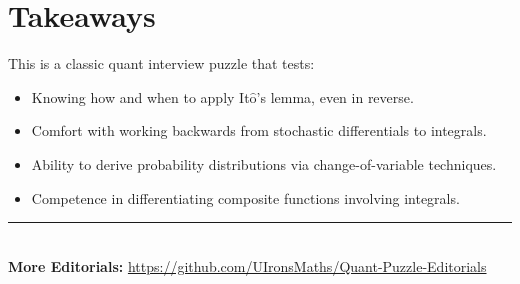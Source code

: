 \documentclass[12pt]{article}
\newcommand{\Itos}{It$\hat{\text{o}}$'s }
\begin{document}
\bigskip

\section*{Takeaways}
This is a classic quant interview puzzle that tests:

\begin{itemize}
    \item Knowing how and when to apply \Itos lemma, even in reverse.
    \item Comfort with working backwards from stochastic differentials to integrals.
    \item Ability to derive probability distributions via change-of-variable techniques.
    \item Competence in differentiating composite functions involving integrals.
\end{itemize}


\vspace*{\fill}
\begin{center}
    \rule{\linewidth}{0.5pt} \\
    \textbf{More Editorials:} \href{https://github.com/UIronsMaths/Quant-Puzzle-Editorials}{https://github.com/UIronsMaths/Quant-Puzzle-Editorials}
\end{center}
\end{document}
